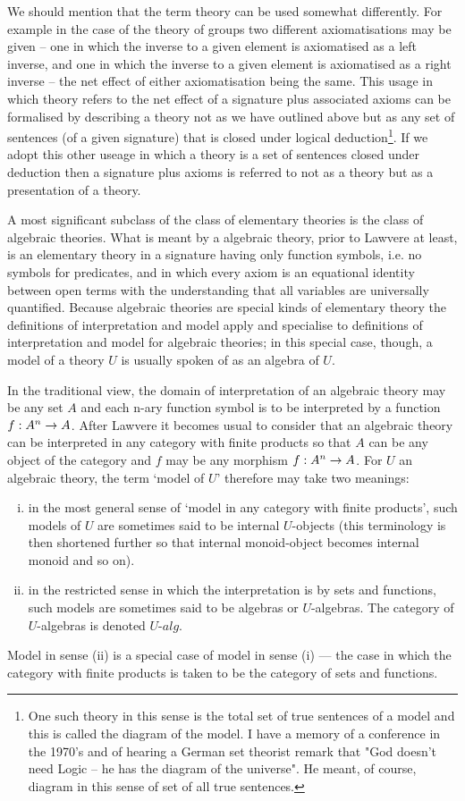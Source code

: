 We should mention that the term theory can be used somewhat differently. 
For example in the case of the theory of groups two different axiomatisations may be given 
-- one in which the inverse to a given element is axiomatised as a left inverse, and one in which the inverse to a given element is axiomatised as a right inverse --
the net effect of either axiomatisation being the same.
This usage in which  theory refers to the net effect of a signature plus associated axioms
can be formalised by describing a 
theory not as we have outlined above but as any set of sentences
 (of a given signature) that is closed under logical deduction\footnote{One such theory in this sense is the total set of true sentences of a model and  
this is called the diagram of the model. I have a  memory of a conference in the 1970's and of hearing a German set theorist
 remark that "God doesn't need Logic -- he has the diagram of the universe". He meant, of course, diagram in this sense of set of all true sentences.}. 
If we adopt this other useage in which a theory is a set of sentences closed under deduction then a signature plus axioms is referred to not as a theory but as a presentation of a theory. 


A most significant subclass of the class of elementary theories is the class of algebraic theories. 
What is meant by a algebraic theory, prior to Lawvere at least, is an elementary theory in a signature having only function symbols, i.e. no symbols for predicates, 
and in which every axiom is an equational identity between open terms with the understanding that
all variables are universally quantified. 
Because algebraic theories are special kinds of elementary theory the definitions of interpretation and model apply and specialise to definitions of 
interpretation and model for algebraic theories; in this special case, though, a model of a theory $U$ is usually spoken of as an algebra of $U$.


In the traditional view, the domain of interpretation of an algebraic theory may be any set $A$ 
and each n-ary function symbol is to be interpreted by a  function $f:A^n \rightarrow A$.
After Lawvere it becomes usual to consider that an algebraic theory can be interpreted in any category with finite products
 so that $A$ can be any object of the category and  $f$ may be any morphism $f:A^n \rightarrow A$. 
For $U$ an algebraic theory, the term `model of $U$' therefore may take two meanings:
\begin{enumerate}[(i)]
\item in the most general sense of `model in any category  with finite products',
 such models of $U$ are sometimes said to be internal $U$-objects (this terminology is then shortened further so that internal monoid-object becomes internal monoid and so on). 
\item in the restricted sense in which the interpretation is by sets and functions, such models are sometimes said to be algebras or
$U$-algebras. The category of $U$-algebras is denoted $U$-$alg$. 
\end{enumerate} 
Model in sense (ii) is a special case of model in sense (i) ---  the case in which the category with finite products is taken to be the category of sets and functions.

